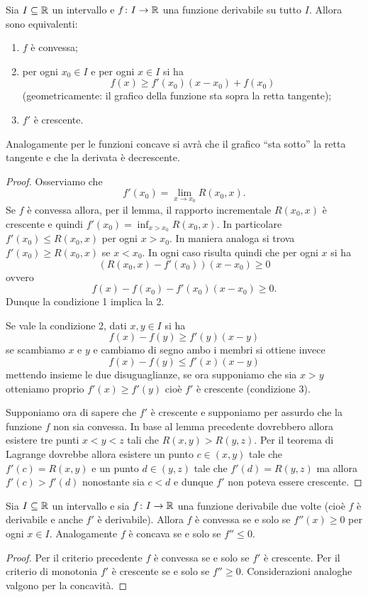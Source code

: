 \begin{theorem}
\mymark{***}
Sia $I\subseteq \mathbb R$ un intervallo e $f\colon I \to \mathbb R$ una funzione derivabile su tutto $I$.
Allora sono equivalenti:
\begin{enumerate}
\item $f$ è convessa;
\item per ogni $x_0 \in I$ e per ogni $x\in I$ si ha
\[
   f(x) \ge f'(x_0) (x-x_0) + f(x_0)
\]
(geometricamente: il grafico della funzione sta sopra la retta tangente);
\item $f'$ è crescente.
\end{enumerate}

Analogamente per le funzioni concave si avrà che il grafico ``sta sotto'' la retta tangente e che la derivata è decrescente.
\end{theorem}
%
\begin{proof}
\mymark{**}
Osserviamo che
\[
  f'(x_0) = \lim_{x\to x_0} R(x_0,x).
\]
Se $f$ è convessa allora, per il lemma, il rapporto incrementale $R(x_0,x)$ è crescente e quindi  $f'(x_0) = \inf_{x>x_0} R(x_0,x)$. In particolare $f'(x_0) \le R(x_0,x)$ per ogni $x> x_0$. In maniera analoga si trova $f'(x_0) \ge R(x_0,x)$ se $x<x_0$.
In ogni caso risulta quindi che per ogni $x$ si ha
\[
(R(x_0,x)- f'(x_0))(x-x_0)\ge 0
\]
ovvero
\[
  f(x) - f(x_0) - f'(x_0)(x-x_0) \ge 0.
\]
Dunque la condizione 1 implica la 2.

Se vale la condizione 2, dati $x,y \in I$ si ha
\[
  f(x) - f(y) \ge f'(y)(x-y)
\]
se scambiamo $x$ e $y$ e cambiamo di segno ambo i membri si ottiene invece
\[
  f(x) - f(y) \le f'(x)(x-y)
\]
mettendo insieme le due disuguaglianze,
se ora supponiamo che sia $x>y$ otteniamo proprio
$f'(x) \ge f'(y)$ cioè $f'$ è crescente (condizione 3).

Supponiamo ora di sapere che $f'$ è crescente e supponiamo per assurdo che la funzione $f$ non sia convessa.
In base al lemma precedente dovrebbero allora esistere tre punti $x<y<z$ tali che $R(x,y)> R(y,z)$. Per il teorema di Lagrange dovrebbe allora esistere un punto $c\in (x,y)$ tale che $f'(c) = R(x,y)$ e un punto $d \in (y,z)$ tale che $f'(d) = R(y,z)$ ma allora
$f'(c) > f'(d)$ nonostante sia $c<d$ e dunque $f'$ non poteva essere crescente.
\end{proof}

\begin{corollary}
\mymark{***}
Sia $I\subseteq \mathbb R$ un intervallo e sia $f\colon I \to \mathbb R$ una funzione derivabile due volte (cioè $f$ è derivabile e anche $f'$ è derivabile).
Allora $f$ è convessa se e solo se $f''(x)\ge 0$ per ogni $x\in I$.
Analogamente $f$ è concava se e solo se $f''\le 0$.
\end{corollary}
\begin{proof}
\mymark{***}
Per il criterio precedente $f$ è convessa se e solo se $f'$ è crescente. Per il criterio di monotonia $f'$ è crescente se e solo se $f'' \ge 0$. Considerazioni analoghe valgono per la concavità.
\end{proof}

